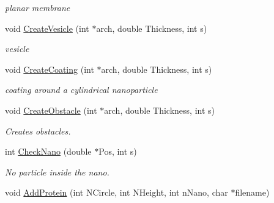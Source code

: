 \begin{DoxyCompactItemize}
\begin{DoxyCompactList}\small\item\em planar membrane \end{DoxyCompactList}\item 
void \hyperlink{classVarData_a13917660616306dcbb2d73689ed3267f}{Create\+Vesicle} (int $\ast$arch, double Thickness, int s)\hypertarget{classVarData_a13917660616306dcbb2d73689ed3267f}{}\label{classVarData_a13917660616306dcbb2d73689ed3267f}

\begin{DoxyCompactList}\small\item\em vesicle \end{DoxyCompactList}\item 
void \hyperlink{classVarData_a1be90f419e3760d66e188cbee8222bcb}{Create\+Coating} (int $\ast$arch, double Thickness, int s)\hypertarget{classVarData_a1be90f419e3760d66e188cbee8222bcb}{}\label{classVarData_a1be90f419e3760d66e188cbee8222bcb}

\begin{DoxyCompactList}\small\item\em coating around a cylindrical nanoparticle \end{DoxyCompactList}\item 
void \hyperlink{classVarData_aa0b394048be15caa4b4a8c3599bffb6d}{Create\+Obstacle} (int $\ast$arch, double Thickness, int s)\hypertarget{classVarData_aa0b394048be15caa4b4a8c3599bffb6d}{}\label{classVarData_aa0b394048be15caa4b4a8c3599bffb6d}

\begin{DoxyCompactList}\small\item\em Creates obstacles. \end{DoxyCompactList}\item 
int \hyperlink{classVarData_abc3ca3798883d9b80ef3e40e692ab825}{Check\+Nano} (double $\ast$Pos, int s)\hypertarget{classVarData_abc3ca3798883d9b80ef3e40e692ab825}{}\label{classVarData_abc3ca3798883d9b80ef3e40e692ab825}

\begin{DoxyCompactList}\small\item\em No particle inside the nano. \end{DoxyCompactList}\item 
void \hyperlink{classVarData_a22dbbf0d52320459e74b307887332205}{Add\+Protein} (int N\+Circle, int N\+Height, int n\+Nano, char $\ast$filename)\hypertarget{classVarData_a22dbbf0d52320459e74b307887332205}{}\label{classVarData_a22dbbf0d52320459e74b307887332205}


\end{DoxyCompactItemize}
